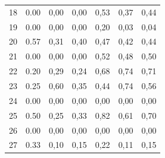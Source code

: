 \begin{table}[ht]
\begin{tabular}{l|c|c|c|c|c|c}
        18    & 0.00                                    & 0,00                                        & 0,00      &
        0,53  & 0,37                                    & 0,44                                                      \\
        19    & 0.00                                    & 0,00                                        & 0,00      &
        0,20  & 0,03                                    & 0,04                                                      \\
        20    & 0.57                                    & 0,31                                        & 0,40      &
        0,47  & 0,42                                    & 0,44                                                      \\
        21    & 0.00                                    & 0,00                                        & 0,00      &
        0,52  & 0,48                                    & 0,50                                                      \\
        22    & 0.20                                    & 0,29                                        & 0,24      &
        0,68  & 0,74                                    & 0,71                                                      \\
        23    & 0.25                                    & 0,60                                        & 0,35      &
        0,44  & 0,74                                    & 0,56                                                      \\
        24    & 0.00                                    & 0,00                                        & 0,00      &
        0,00  & 0,00                                    & 0,00                                                      \\
        25    & 0.50                                    & 0,25                                        & 0,33      &
        0,82  & 0,61                                    & 0,70                                                      \\
        26    & 0.00                                    & 0,00                                        & 0,00      &
        0,00  & 0,00                                    & 0,00                                                      \\
        27    & 0.33                                    & 0,10                                        & 0,15      &
        0,22  & 0,11                                    & 0,15                                                      \\

\end{tabular}
\end{table}
